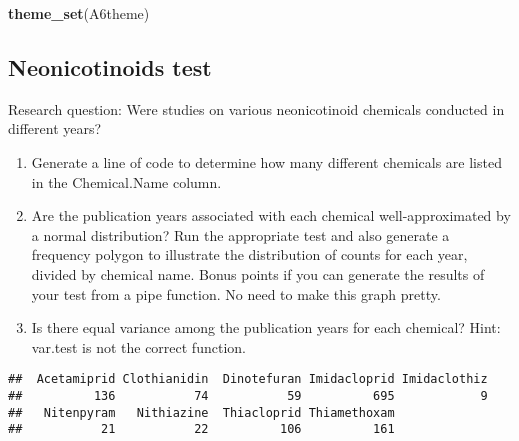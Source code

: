 \documentclass[]{article}
\newenvironment{Shaded}{\begin{snugshade}}{\end{snugshade}}
\newcommand{\KeywordTok}[1]{\textcolor[rgb]{0.13,0.29,0.53}{\textbf{#1}}}
\newcommand{\CommentTok}[1]{\textcolor[rgb]{0.56,0.35,0.01}{\textit{#1}}}
\newcommand{\OperatorTok}[1]{\textcolor[rgb]{0.81,0.36,0.00}{\textbf{#1}}}
\newcommand{\NormalTok}[1]{#1}
\begin{document}
\begin{Shaded}
\begin{Highlighting}[]
\KeywordTok{theme_set}\NormalTok{(A6theme)}
\end{Highlighting}
\end{Shaded}

\subsection{Neonicotinoids test}\label{neonicotinoids-test}

Research question: Were studies on various neonicotinoid chemicals
conducted in different years?

\begin{enumerate}
\def\labelenumi{\arabic{enumi}.}
\setcounter{enumi}{2}
\item
  Generate a line of code to determine how many different chemicals are
  listed in the Chemical.Name column.
\item
  Are the publication years associated with each chemical
  well-approximated by a normal distribution? Run the appropriate test
  and also generate a frequency polygon to illustrate the distribution
  of counts for each year, divided by chemical name. Bonus points if you
  can generate the results of your test from a pipe function. No need to
  make this graph pretty.
\item
  Is there equal variance among the publication years for each chemical?
  Hint: var.test is not the correct function.
\end{enumerate}

\begin{Shaded}
\end{Shaded}

\begin{verbatim}
##  Acetamiprid Clothianidin  Dinotefuran Imidacloprid Imidaclothiz 
##          136           74           59          695            9 
##   Nitenpyram   Nithiazine  Thiacloprid Thiamethoxam 
##           21           22          106          161
\end{verbatim}

\begin{Shaded}
\end{Shaded}
\end{document}
